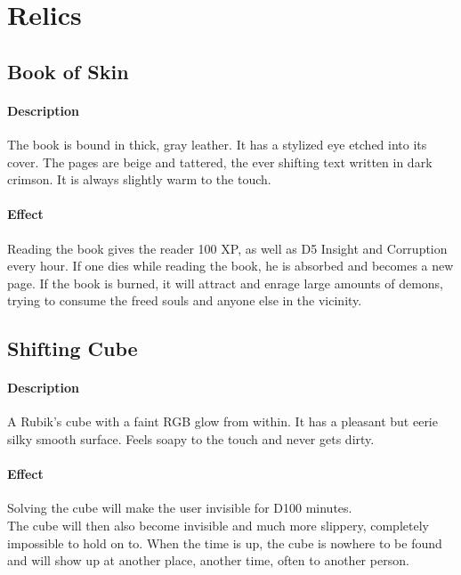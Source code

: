 \section{Relics}
\vspace{10mm}
\begin{multicols}{2}
\subsection*{Book of Skin}
\paragraph{Description}
The book is bound in thick, gray leather.
It has a stylized eye etched into its cover.
The pages are beige and tattered,
	the ever shifting text written in dark crimson.
It is always slightly warm to the touch.
\paragraph{Effect}
Reading the book gives the reader
	100 XP, as well as D5 Insight and Corruption every hour.
If one dies while reading the book, he is absorbed and becomes a new page.
If the book is burned, it will attract and enrage large amounts of demons,
	trying to consume the freed souls and anyone else in the vicinity.
\columnbreak
{}
\end{multicols}

\subsection*{Shifting Cube}
\paragraph{Description}
A Rubik's cube with a faint RGB glow from within.
It has a pleasant but eerie silky smooth surface.
Feels soapy to the touch and never gets dirty.
\paragraph{Effect}
Solving the cube will make the user invisible for D100 minutes.
\\%
The cube will then also become invisible and much more slippery,
	completely impossible to hold on to.
When the time is up,
	the cube is nowhere to be found
	and will show up at another place, another time, often to another person.

